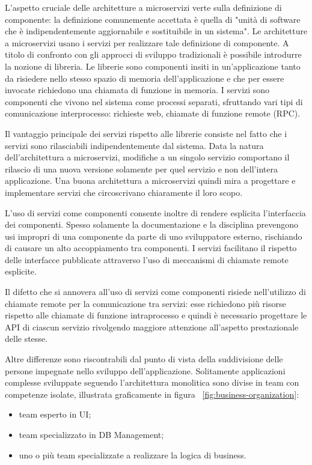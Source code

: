 L'aspetto cruciale delle architetture a microservizi verte sulla definizione di componente: la definizione comunemente accettata è quella di "unità di software che è indipendentemente aggiornabile e sostituibile in un sistema".
Le architetture a microservizi usano i servizi per realizzare tale definizione di componente. A titolo di confronto con gli approcci di sviluppo tradizionali è possibile introdurre la nozione di libreria.
Le librerie sono componenti insiti in un'applicazione tanto da risiedere nello stesso spazio di memoria dell'applicazione e che per essere invocate richiedono una chiamata di funzione in memoria.
I servizi sono componenti che vivono nel sistema come processi separati, sfruttando vari tipi di comunicazione interprocesso: richieste web, chiamate di funzione remote (RPC).

Il vantaggio principale dei servizi rispetto alle librerie consiste nel fatto che i servizi sono rilasciabili indipendentemente dal sistema.
Data la natura dell'architettura a microservizi, modifiche a un singolo servizio comportano il rilascio di una nuova versione solamente per quel servizio e non dell'intera applicazione.
Una buona architettura a microservizi quindi mira a progettare e implementare servizi che circoscrivano chiaramente il loro scopo.

L'uso di servizi come componenti consente inoltre di rendere esplicita l'interfaccia dei componenti.
Spesso solamente la documentazione e la disciplina prevengono usi impropri di una componente da parte di uno sviluppatore esterno, rischiando di causare un alto accoppiamento tra componenti.
I servizi facilitano il rispetto delle interfacce pubblicate attraverso l'uso di meccanismi di chiamate remote esplicite.

Il difetto che si annovera all'uso di servizi come componenti risiede nell'utilizzo di chiamate remote per la comunicazione tra servizi:
esse richiedono più risorse rispetto alle chiamate di funzione intraprocesso e quindi è necessario progettare le API di ciascun servizio rivolgendo maggiore attenzione all'aspetto prestazionale delle stesse.

Altre differenze sono riscontrabili dal punto di vista della suddivisione delle persone impegnate nello sviluppo dell'applicazione.
Solitamente applicazioni complesse sviluppate seguendo l'architettura monolitica sono divise in team con competenze isolate, illustrata graficamente in figura ~\ref{fig:business-organization}:
\begin{itemize}
  \item team esperto in UI;
  \item team specializzato in DB Management;
  \item uno o più team specializzate a realizzare la logica di business.
\end{itemize}


